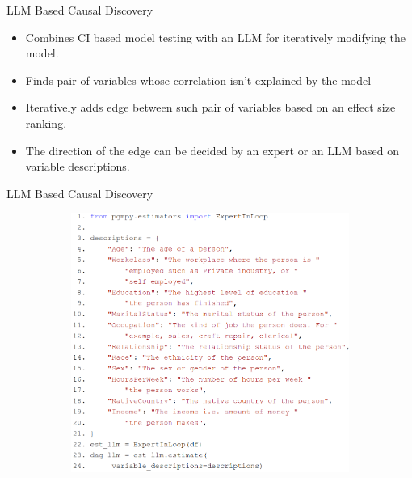 \documentclass{beamer}
\begin{document}
\begin{frame}{LLM Based Causal Discovery}
	\begin{itemize}
		\item Combines CI based model testing with an LLM for iteratively modifying the model.
		\item Finds pair of variables whose correlation isn't explained by the model
		\item Iteratively adds edge between such pair of variables based on an effect size ranking.
		\item The direction of the edge can be decided by an expert or an LLM based on variable descriptions.
	\end{itemize}
\end{frame}
\begin{frame}{LLM Based Causal Discovery}
	\begin{figure}
		\begin{subfigure}{0.55 \textwidth}
			\centering
			\includegraphics[scale=0.23]{imgs/dag_llm.png}
		\end{subfigure}%
		\begin{subfigure}{0.45 \textwidth}
			\centering

\end{subfigure}
\end{figure}
\end{frame}
\end{document}
